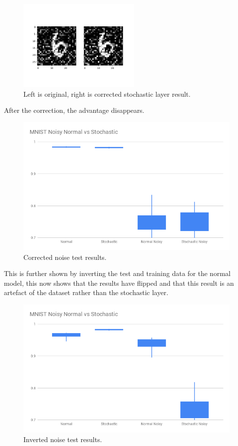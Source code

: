 \documentclass[a4paper,oneside,phd,etd]{BYUPhys}
\begin{document}
\begin{figure}[H]
\centering
\includegraphics[width=6cm]{results/stochastic_layer_pass_corrected.png}
\caption{Left is original, right is corrected stochastic layer result.}
\label{fig:noise_stochastic}
\end{figure}

After the correction, the advantage disappears.
\begin{figure}[H]
\centering
\includegraphics[width=16cm]{results/bitsize_corrected.png}
\caption{Corrected noise test results.}
\label{fig:noise_corrected}
\end{figure}

This is further shown by inverting the test and training data for the normal model, this now shows that the results have flipped and that this result is an artefact of the dataset rather than the stochastic layer.
\begin{figure}[H]
\centering
\includegraphics[width=16cm]{results/normal_inverted.png}
\caption{Inverted noise test results.}
\label{fig:noise_normal_inverted}
\end{figure}
\end{document}

